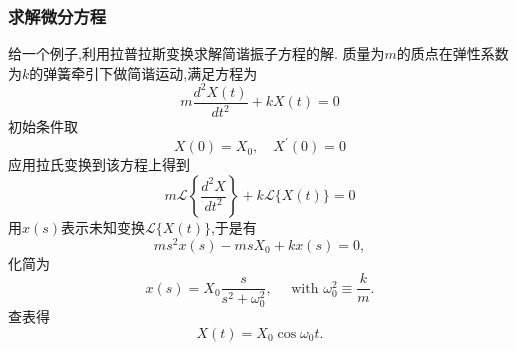 \subsubsection{求解微分方程}
给一个例子,利用拉普拉斯变换求解简谐振子方程的解.
    质量为$m$的质点在弹性系数为$k$的弹簧牵引下做简谐运动,满足方程为
    $$
m \frac{d^2 X(t)}{d t^2}+k X(t)=0
$$
初始条件取
$$
X(0)=X_0, \quad X^{\prime}(0)=0
$$
应用拉氏变换到该方程上得到
$$
m \mathcal{L}\left\{\frac{d^2 X}{d t^2}\right\}+k \mathcal{L}\{X(t)\}=0
$$
用$x(s)$表示未知变换$\mathcal{L}\{ X(t)\}$,于是有
$$
m s^2 x(s)-m s X_0+k x(s)=0 ,
$$
化简为
$$
x(s)=X_0 \frac{s}{s^2+\omega_0^2}, \quad \text { with } \omega_0^2 \equiv \frac{k}{m} .
$$
查表得
$$
X(t)=X_0 \cos \omega_0 t .
$$
